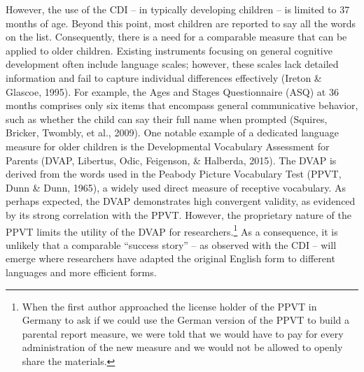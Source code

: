 \documentclass[
  man,floatsintext]{apa6}
\begin{document}
However, the use of the CDI -- in typically developing children -- is limited to 37 months of age. Beyond this point, most children are reported to say all the words on the list. Consequently, there is a need for a comparable measure that can be applied to older children. Existing instruments focusing on general cognitive development often include language scales; however, these scales lack detailed information and fail to capture individual differences effectively (Ireton \& Glascoe, 1995). For example, the Ages and Stages Questionnaire (ASQ) at 36 months comprises only six items that encompass general communicative behavior, such as whether the child can say their full name when prompted (Squires, Bricker, Twombly, et al., 2009). One notable example of a dedicated language measure for older children is the Developmental Vocabulary Assessment for Parents (DVAP, Libertus, Odic, Feigenson, \& Halberda, 2015). The DVAP is derived from the words used in the Peabody Picture Vocabulary Test (PPVT, Dunn \& Dunn, 1965), a widely used direct measure of receptive vocabulary. As perhaps expected, the DVAP demonstrates high convergent validity, as evidenced by its strong correlation with the PPVT. However, the proprietary nature of the PPVT limits the utility of the DVAP for researchers.\footnote{When the first author approached the license holder of the PPVT in Germany to ask if we could use the German version of the PPVT to build a parental report measure, we were told that we would have to pay for every administration of the new measure and we would not be allowed to openly share the materials.} As a consequence, it is unlikely that a comparable ``success story'' -- as observed with the CDI -- will emerge where researchers have adapted the original English form to different languages and more efficient forms.
\end{document}
